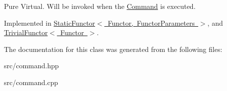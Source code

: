 Pure Virtual. Will be invoked when the \mbox{\hyperlink{class_command}{Command}} is executed. 

Implemented in \mbox{\hyperlink{class_static_functor_a1d8fe0ec2f9965c5f95ad182a8df510b}{Static\+Functor$<$ Functor, Functor\+Parameters $>$}}, and \mbox{\hyperlink{class_trivial_functor_a5f9b8d18c11a057c2b3e97703262d1e9}{Trivial\+Functor$<$ Functor $>$}}.



The documentation for this class was generated from the following files\+:\begin{DoxyCompactItemize}
\item 
src/command.\+hpp\item 
src/command.\+cpp\end{DoxyCompactItemize}
